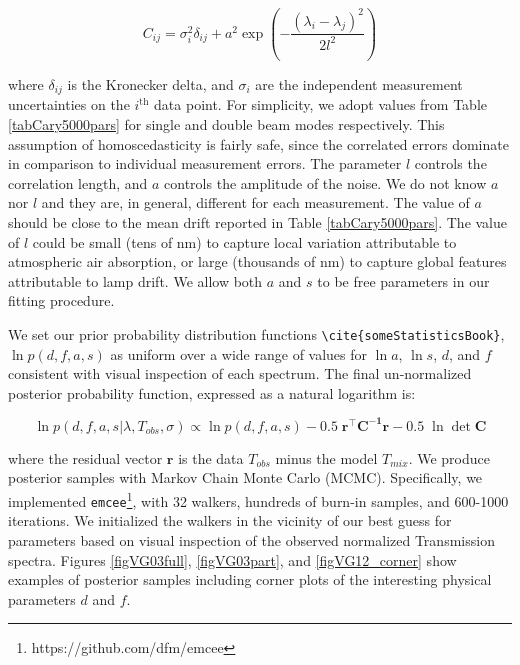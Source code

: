 \documentclass[osajnl,preprint,showpacs,superscriptaddress,12pt]{revtex4-1} %
\begin{document}
\begin{equation}
	C_{ij} = \sigma^2_{i}\delta_{ij}+a^2\exp{(-\frac{(\lambda_i-\lambda_j)^2}{2l^2})} \label{eqnGPkernel}
\end{equation}

where $\delta_{ij}$ is the Kronecker delta, and $\sigma_i$ are the independent measurement uncertainties on the $i^{\mathrm{th}}$ data point. For simplicity, we adopt values from Table \ref{tabCary5000pars} for single and double beam modes respectively.  This assumption of homoscedasticity is fairly safe, since the correlated errors dominate in comparison to individual measurement errors.  The parameter $l$ controls the correlation length, and $a$ controls the amplitude of the noise.  We do not know $a$ nor $l$ and they are, in general, different for each measurement.  The value of $a$ should be close to the mean drift reported in Table \ref{tabCary5000pars}.  The value of $l$ could be small (tens of nm) to capture local variation attributable to atmospheric air absorption, or large (thousands of nm) to capture global features attributable to lamp drift.  We allow both $a$ and $s$ to be free parameters in our fitting procedure.

We set our prior probability distribution functions \verb|\cite{someStatisticsBook}|, $\ln{p(d,f,a,s)}$ as uniform over a wide range of values for $\ln{a}$, $\ln{s}$, $d$, and $f$ consistent with visual inspection of each spectrum.  The final un-normalized posterior probability function, expressed as a natural logarithm is:

\begin{equation}
	\ln{p(d,f,a,s|\lambda, T_{obs}, \sigma)} \propto \ln{p(d,f,a,s)} -0.5\;\boldsymbol{r^\intercal}\boldsymbol{C^{-1}}\boldsymbol{r} -0.5\;\ln{\det{\boldsymbol{C}}} \label{eqnPosterior}
\end{equation}	

where the residual vector $\boldsymbol{r}$ is the data $T_{obs}$ minus the model $T_{mix}$.  We produce posterior samples with Markov Chain Monte Carlo (MCMC).  Specifically, we implemented \texttt{emcee}\footnote{https://github.com/dfm/emcee}\cite{emcee}, with 32 walkers, hundreds of burn-in samples, and 600-1000 iterations.  We initialized the walkers in the vicinity of our best guess for parameters based on visual inspection of the observed normalized Transmission spectra.  Figures \ref{figVG03full}, \ref{figVG03part}, and \ref{figVG12_corner} show examples of posterior samples including corner plots of the interesting physical parameters $d$ and $f$.
\end{document}
